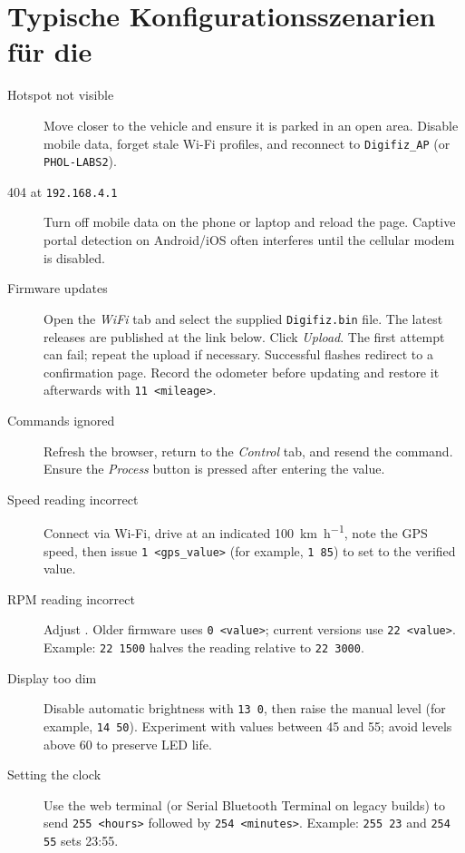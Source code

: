 \chapter{Typische Konfigurationsszenarien für die \ReplicaNextShort{}}\label{ch:replica-next-scenarios}

\begin{description}
    \item[Hotspot not visible] Move closer to the vehicle and ensure it is parked in an open area. Disable mobile data, forget stale Wi-Fi profiles, and reconnect to \texttt{Digifiz\_AP} (or \texttt{PHOL-LABS2}).
    \item[404 at \texttt{192.168.4.1}] Turn off mobile data on the phone or laptop and reload the page. Captive portal detection on Android/iOS often interferes until the cellular modem is disabled.
    \item[Firmware updates] Open the \emph{WiFi} tab and select the supplied \texttt{Digifiz.bin} file. The latest releases are published at the link below.
        Click \emph{Upload}. The first attempt can fail; repeat the upload if necessary. Successful flashes redirect to a confirmation page. Record the odometer before updating and restore it afterwards with \verb|11 <mileage>|.
    \item[Commands ignored] Refresh the browser, return to the \emph{Control} tab, and resend the command. Ensure the \emph{Process} button is pressed after entering the value.
    \item[Speed reading incorrect] Connect via Wi-Fi, drive at an indicated \SI{100}{\kilo\metre\per\hour}, note the GPS speed, then issue \verb|1 <gps_value>| (for example, \verb|1 85|) to set  to the verified value.
    \item[RPM reading incorrect] Adjust . Older firmware uses \verb|0 <value>|; current versions use \verb|22 <value>|. Example: \verb|22 1500| halves the reading relative to \verb|22 3000|.
    \item[Display too dim] Disable automatic brightness with \verb|13 0|, then raise the manual level (for example, \verb|14 50|). Experiment with values between 45 and 55; avoid levels above 60 to preserve LED life.
    \item[Setting the clock] Use the web terminal (or Serial Bluetooth Terminal on legacy builds) to send \verb|255 <hours>| followed by \verb|254 <minutes>|. Example: \verb|255 23| and \verb|254 55| sets 23:55.

\end{description}
